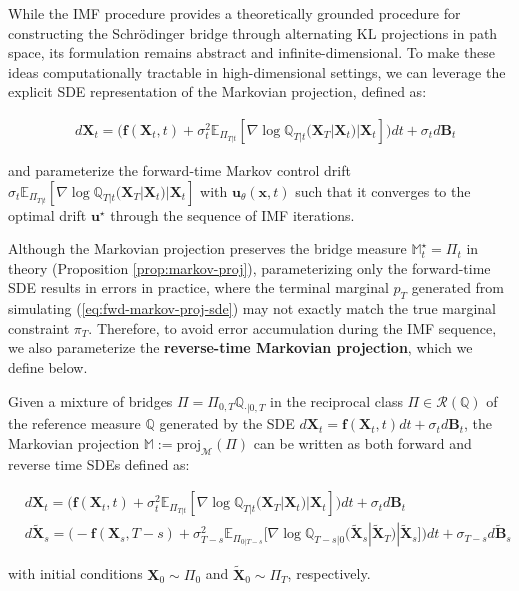 \documentclass{article}
\newcommand{\boldtext}[1]{\textbf{\textcolor{MyGreen}{#1}}}
\begin{document}
While the IMF procedure provides a theoretically grounded procedure for constructing the Schrödinger bridge through alternating KL projections in path space, its formulation remains abstract and infinite-dimensional. To make these ideas computationally tractable in high-dimensional settings, we can leverage the explicit SDE representation of the Markovian projection, defined as:
\begin{small}
\begin{align}
    &d\boldsymbol{X}_t=\big(\boldsymbol{f}(\boldsymbol{X}_t,t)+\sigma_t^2\mathbb{E}_{\Pi_{T|t}}\left[\nabla  \log\mathbb{Q}_{T|t}(\boldsymbol{X}_T|\boldsymbol{X}_t)|\boldsymbol{X}_t\right]\big)dt+\sigma_td\boldsymbol{B}_t\tag{Forward Markovian Projection SDE}\label{eq:fwd-markov-proj-sde}
\end{align}
\end{small}
and parameterize the forward-time Markov control drift $\sigma_t\mathbb{E}_{\Pi_{T|t}}\left[\nabla  \log\mathbb{Q}_{T|t}(\boldsymbol{X}_T|\boldsymbol{X}_t)|\boldsymbol{X}_t\right]$ with $\boldsymbol{u}_\theta(\boldsymbol{x},t)$ such that it converges to the optimal drift $\boldsymbol{u}^\star$ through the sequence of IMF iterations. 

Although the Markovian projection preserves the bridge measure $\mathbb{M}^\star_t=\Pi_t$ in theory (Proposition \ref{prop:markov-proj}), parameterizing only the forward-time SDE results in errors in practice, where the terminal marginal $p_T$ generated from simulating (\ref{eq:fwd-markov-proj-sde}) may not exactly match the true marginal constraint $\pi_T$. Therefore, to avoid error accumulation during the IMF sequence, we also parameterize the \boldtext{reverse-time Markovian projection}, which we define below.

\begin{proposition}
    Given a mixture of bridges $\Pi=\Pi_{0,T}\mathbb{Q}_{\cdot |0,T}$ in the reciprocal class $\Pi\in \mathcal{R}(\mathbb{Q})$ of the reference measure $\mathbb{Q}$ generated by the SDE $d\boldsymbol{X}_t=\boldsymbol{f}(\boldsymbol{X}_t,t)dt+\sigma_td\boldsymbol{B}_t$, the Markovian projection $\mathbb{M}:=\text{proj}_{\mathcal{M}}(\Pi)$ can be written as both forward and reverse time SDEs defined as:
    \begin{small}
    \begin{align}
        &d\boldsymbol{X}_t=\big(\boldsymbol{f}(\boldsymbol{X}_t,t)+\sigma_t^2\mathbb{E}_{\Pi_{T|t}}\left[\nabla  \log\mathbb{Q}_{T|t}(\boldsymbol{X}_T|\boldsymbol{X}_t)|\boldsymbol{X}_t\right]\big)dt+\sigma_td\boldsymbol{B}_t\\
        &d\tilde{\boldsymbol{X}}_s=\big(-\boldsymbol{f}(\boldsymbol{X}_s,T-s)+\sigma_{T-s}^2\mathbb{E}_{\Pi_{0|T-s}}\big[\nabla  \log\mathbb{Q}_{T-s|0}(\tilde{\boldsymbol{X}}_s|\tilde{\boldsymbol{X}}_T)|\tilde{\boldsymbol{X}}_s\big]\big)dt+\sigma_{T-s}d\tilde{\boldsymbol{B}}_s
    \end{align}
    \end{small}
    with initial conditions $\boldsymbol{X}_0\sim \Pi_0$ and $\tilde{\boldsymbol{X}}_0\sim \Pi_T$, respectively.
\end{proposition}
\end{document}
